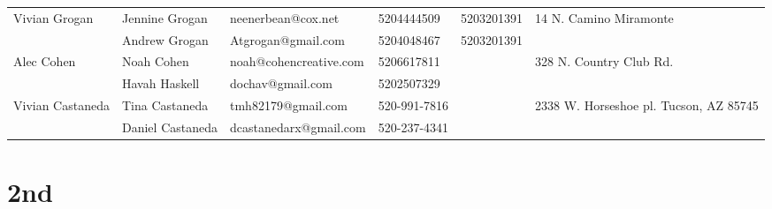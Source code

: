 \documentclass[landscape]{article}\usepackage[]{graphicx}\usepackage[]{color}
\begin{document}
\begin{longtable}{p{70pt}|p{75pt}|p{120pt}|p{60pt}|p{60pt}|p{120pt}|}
\hline
\multirow{2}{70pt}{Vivian Grogan } & Jennine Grogan & neenerbean@cox.net & 5204444509 & 5203201391 & \multirow{2}{100pt}{14 N. Camino Miramonte} \\
 & Andrew Grogan  & Atgrogan@gmail.com  & 5204048467 & 5203201391 & \\
\hline
\multirow{2}{70pt}{Alec Cohen} & Noah Cohen & noah@cohencreative.com & 5206617811 &  & \multirow{2}{100pt}{328 N. Country Club Rd.} \\
 & Havah Haskell & dochav@gmail.com & 5202507329 &  & \\
\hline
\multirow{2}{70pt}{Vivian Castaneda} & Tina Castaneda & tmh82179@gmail.com & 520-991-7816 &  & \multirow{2}{100pt}{2338 W. Horseshoe pl. Tucson, AZ 85745} \\
 & Daniel Castaneda & dcastanedarx@gmail.com & 520-237-4341 &  & \\
\hline
\end{longtable}
\newpage
\section{2nd}
\end{document}
